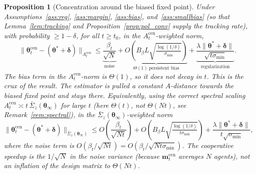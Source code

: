\documentclass[11pt]{article}
\newtheorem{proposition}[theorem]{Proposition}
\begin{document}
\begin{proposition}[Concentration around the biased fixed point]
\label{prop:conc}
Under Assumptions~\ref{ass:reg}, \ref{ass:margin}, \ref{ass:bias},
and~\ref{ass:smallbias} (so that Lemma~\ref{lem:tracking} and
Proposition~\ref{prop:pol_conv} supply the tracking rate), with
probability $\geq 1-\delta$,
for all $t\geq t_0$, in the $A_t^{\mathrm{cen}}$-weighted norm,
\begin{equation}
\|\bm{\theta}_t^{\mathrm{cen}}-(\bm{\theta}^{\!*}+\bm{\delta})\|_{A_t^{\mathrm{cen}}}
\leq\underbrace{\frac{\beta_t}{\sqrt{N}}}_{\text{noise}}
+\underbrace{O\!\left(B_\beta L\sqrt{\tfrac{\log(1/\delta)}{\sigma_{\min}}}\right)}_{\Theta(1)\ \text{persistent bias}}
+\underbrace{\frac{\lambda\|\bm{\theta}^{\!*}+\bm{\delta}\|}{\sqrt{t\sigma_{\min}}}}_{\text{regularization}}.
\label{eq:conc}
\end{equation}
The bias term in the $A_t^{\mathrm{cen}}$-norm is $\Theta(1)$, so it
does \emph{not} decay in $t$.  This is the crux of the result. The
estimator is pulled a constant $A$-distance towards the biased fixed
point and stays there.
Equivalently, using the correct spectral scaling
$A_t^{\mathrm{cen}}\asymp t\,\bar{\Sigma}_z(\bm{\theta}_\infty)$ for large
$t$ (here $\Theta(t)$, \emph{not} $\Theta(Nt)$, see
Remark~\ref{rem:spectral}), in the
$\bar{\Sigma}_z(\bm{\theta}_\infty)$-weighted norm
\begin{equation}
\|\bm{\theta}_t^{\mathrm{cen}}-(\bm{\theta}^{\!*}+\bm{\delta})\|_{\bar{\Sigma}_z(\bm{\theta}_\infty)}
\leq O\!\left(\frac{\beta_t}{\sqrt{N t}}\right)
+O\!\left(B_\beta L\sqrt{\tfrac{\log(1/\delta)}{t\sigma_{\min}}}\right)
+\frac{\lambda\|\bm{\theta}^{\!*}+\bm{\delta}\|}{t\sqrt{\sigma_{\min}}},
\label{eq:conc_sigma}
\end{equation}
where the noise term is $O(\beta_t/\sqrt{Nt})=O(\beta_t/\sqrt{Nt\sigma_{\min}})$.
The cooperative speedup is the $1/\sqrt N$ in the noise
\emph{variance} (because $\bm{m}_t^{\mathrm{cen}}$ averages $N$ agents),
\emph{not} an inflation of the design matrix to $\Theta(Nt)$.
\end{proposition}
\end{document}
